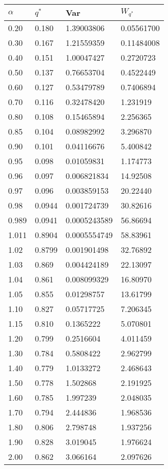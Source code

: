 \documentclass[oneside,10pt]{article}
\begin{document}
\begin{table}[h]
\caption{\small
 }
\begin{center}{\scriptsize
\begin{tabular}{l l l l}
\hline \hline
$\alpha$ &$q^*$  &Var  &$W_{q^*}$ \\\hline
0.20 &0.180& 1.39003806& 0.05561700\\
0.30 &0.167& 1.21559359& 0.11484008\\
0.40 &0.151& 1.00047427& 0.2720723\\
0.50 &0.137& 0.76653704& 0.4522449\\
0.60 &0.127& 0.53479789& 0.7406894\\
0.70 &0.116& 0.32478420& 1.231919\\
0.80 &0.108& 0.15465894& 2.256365\\
0.85 &0.104& 0.08982992& 3.296870\\
0.90 &0.101& 0.04116676& 5.400842\\
0.95 &0.098& 0.01059831 &1.174773\\
0.96 &0.097& 0.006821834 & 14.92508\\
0.97 &0.096& 0.003859153 &20.22440\\
0.98   &0.0944& 0.001724739&    30.82616\\
0.989 & 0.0941& 0.0005243589& 56.86694\\
1.011 & 0.8904& 0.0005554749& 58.83961\\
1.02 & 0.8799& 0.001901498&  32.76892\\
1.03  & 0.869& 0.004424189& 22.13097\\
1.04 &0.861& 0.008099329& 16.80970\\
1.05 & 0.855& 0.01298757& 13.61799\\
1.10 &0.827& 0.05717725& 7.206345\\
1.15 &0.810& 0.1365222& 5.070801\\
1.20 &0.799& 0.2516604& 4.011459\\
1.30 &0.784& 0.5808422& 2.962799\\
1.40 &0.779& 1.0133272& 2.468643\\
1.50 &0.778& 1.502868& 2.191925\\
1.60 &0.785 &1.997239& 2.048035\\
1.70 & 0.794 &2.444836& 1.968536\\
1.80 &0.806 &2.798748& 1.937256\\
1.90 &0.828 &3.019045& 1.976624\\
2.00 &0.862 &3.066164& 2.097626\\
\hline\hline
\end{tabular}
}
\end{center}
\label{tab_oq}
\end{table}
\end{document}
